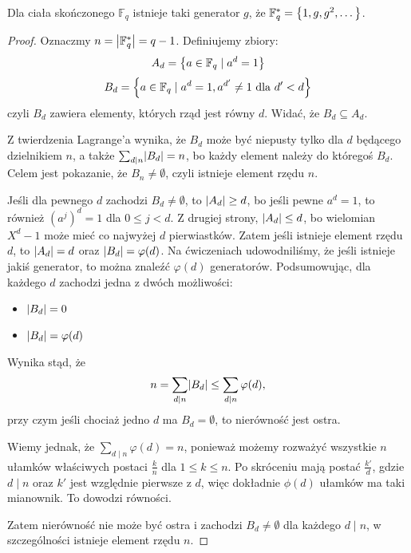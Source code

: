 \begin{theorem}
Dla ciała skończonego \( \mathbb{F}_q \) istnieje taki generator \( g \), że \( \mathbb{F}^{*}_q = \set{1, g, g^2, \text{\dots}} \).
\end{theorem}
\begin{proof}
    Oznaczmy \( n = \left\lvert\mathbb{F}^{*}_q\right\rvert = q-1 \). Definiujemy zbiory:
    \[
        A_d = \set{a \in \mathbb{F}_q \mid a^d = 1}
    \]
    \[
        B_d = \set{a \in \mathbb{F}_q \mid a^d = 1, a^{d'} \neq 1 \text{ dla } d' < d}
    \]
    czyli \( B_d \) zawiera elementy, których rząd jest równy \( d \). Widać, że \( B_d \subseteq A_d \).

    Z twierdzenia Lagrange'a wynika, że \( B_d \) może być niepusty tylko dla \( d \) będącego dzielnikiem \( n \), a także \( \sum_{d \mid n} \abs{B_d} = n \), bo każdy element należy do któregoś \( B_d \). Celem jest pokazanie, że \( B_n \neq \emptyset \), czyli istnieje element rzędu \( n \).

    Jeśli dla pewnego \( d \) zachodzi \( B_d \neq \emptyset \), to \( \left\lvert A_d\right\rvert \geq d \), bo jeśli pewne \( a^d = 1 \), to również \( (a^j)^d = 1 \) dla \( 0 \leq j < d \). Z drugiej strony, \( \left\lvert A_d\right\rvert \leq d \), bo wielomian \( X^d-1 \) może mieć co najwyżej \( d \) pierwiastków. Zatem jeśli istnieje element rzędu \( d \), to \( \left\lvert A_d\right\rvert = d \) oraz \( \left\lvert B_d\right\rvert = \varphi(d) \).
    Na ćwiczeniach udowodniliśmy, że jeśli istnieje jakiś generator, to można znaleźć \( \varphi(d) \) generatorów.
    Podsumowując, dla każdego \( d \) zachodzi jedna z dwóch możliwości:
    \begin{itemize}
        \item \( \left\lvert B_d\right\rvert = 0 \)
        \item \( \left\lvert B_d\right\rvert = \varphi(d) \)
    \end{itemize}
    Wynika stąd, że
    \[
        n = \sum_{d \mid n} \abs{B_d} \leq \sum_{d \mid n} \varphi(d), 
    \]
    przy czym jeśli chociaż jedno \( d \) ma \( B_d = \emptyset \), to nierówność jest ostra.
    
    Wiemy jednak, że \( \sum_{d \mid n} \varphi(d) = n \), ponieważ możemy rozważyć wszystkie \( n \) ułamków właściwych postaci \( \frac{k}{n} \) dla \( 1 \leq k \leq n \).
    Po skróceniu mają postać \( \frac{k'}{d} \), gdzie \( d \mid n \) oraz \( k' \) jest względnie pierwsze z \( d \), więc dokładnie \( \phi(d) \) ułamków ma taki mianownik. To dowodzi równości.

    Zatem nierówność nie może być ostra i zachodzi \( B_d \neq \emptyset \) dla każdego \( d \mid n \), w szczególności istnieje element rzędu \( n \).
\end{proof}